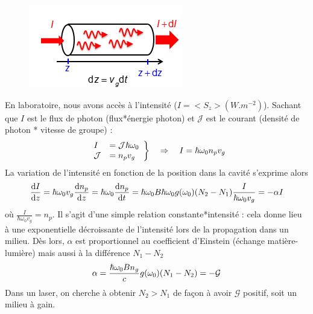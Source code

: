 	\begin{figure}
	\vspace{-5mm}
	\includegraphics[scale=0.75]{ch2/image15.png}
	\end{figure}
	En laboratoire, nous avons accès à l'intensité ($I = <S_z> (W.m^{-2})$). Sachant que 
	$I$ est le flux de photon (flux*énergie photon) et $\mathcal{J}$ est le courant (densité 
	de photon * vitesse de groupe) :
	\begin{equation}
	\left.\begin{array}{ll}
	I &= {\cal J}\hbar {\omega _0}\\
	{\cal J} &= {n_p}{v_g}
	\end{array}\right\}\quad\Rightarrow\quad I = \hbar {\omega _0}{n_p}{v_g}
	\end{equation}
	La variation de l'intensité en fonction de la position dans la cavité s'exprime alors
	\begin{equation}
	\frac{{{\rm{d}}I}}{{{\rm{d}}z}} = \hbar {\omega _0}{v_g}\frac{{{\rm{d}}{n_p}}}{{{\rm{d}}z}} = \hbar {\omega _0}\frac{{{\rm{d}}{n_p}}}{{{\rm{d}}t}}
	 = \hbar {\omega _0}B\hbar {\omega _0}g({\omega _0})({N_2} - {N_1})\frac{I}{{\hbar {\omega _0}{v_g}}} =  - \alpha I
	\end{equation}
	où $\frac{I}{{\hbar {\omega _0}{v_g}}}=n_p$. Il s'agit d'une simple relation constante*intensité : 
	cela donne lieu à une exponentielle décroissante de l'intensité lors de la propagation dans un 
	milieu. Dès lors, $\alpha$ est proportionnel au coefficient d'Einstein (échange matière-lumière) 
	mais aussi à la différence $N_1-N_2$
	\begin{equation}
	\alpha  = \frac{{\hbar {\omega _0}B{n_g}}}{c}g({\omega _0})({N_1} - {N_2}) =  - {\cal G}
	\end{equation}
	Dans un laser, on cherche à obtenir $N_2>N_1$ de façon à avoir $\mathcal{G}$ positif, soit un 
	milieu à gain.\\
	
